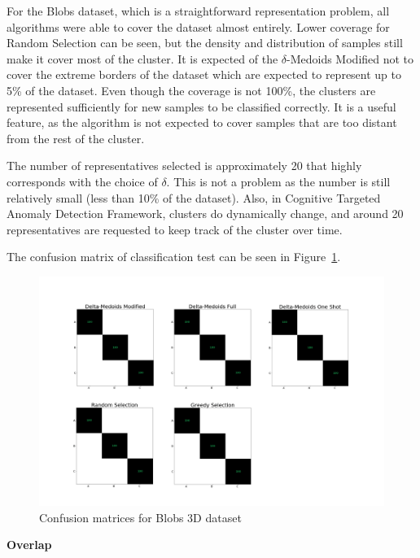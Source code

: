 \documentclass[thesis=B,english]{FITthesis}[2012/10/20]
\begin{document}
\noindent For the Blobs dataset, which is a straightforward representation problem, all algorithms were able to cover the dataset almost entirely.
Lower coverage for Random Selection can be seen, but the density and distribution of samples still make it cover most of the cluster.
It is expected of the $\delta$-Medoids Modified not to cover the extreme borders of the dataset which are expected to represent up to 5\% of the dataset.
Even though the coverage is not 100\%, the clusters are represented sufficiently for new samples to be classified correctly.
It is a useful feature, as the algorithm is not expected to cover samples that are too distant from the rest of the cluster.

The number of representatives selected is approximately 20 that highly corresponds with the choice of $\delta$.
This is not a problem as the number is still relatively small (less than 10\% of the dataset).
Also, in Cognitive Targeted Anomaly Detection Framework, clusters do dynamically change, and around 20 representatives are requested to keep track of the cluster over time.

The confusion matrix of classification test can be seen in Figure~\ref{img:exp1_blobs}.

\begin{figure}[H]
   \includegraphics[width=\linewidth]{img/exp1_blobs.png}
  \caption{Confusion matrices for Blobs 3D dataset}
  \label{img:exp1_blobs}
\end{figure}
\medskip

\textbf{Overlap}
\end{document}
